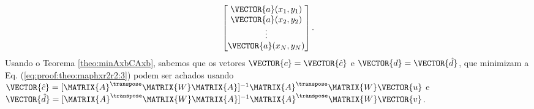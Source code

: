 \begin{myproofT}
\begin{equation}
\begin{bmatrix}
\VECTOR{a}(x_1,y_1)\\
\VECTOR{a}(x_2,y_2)\\
\vdots\\
\VECTOR{a}(x_N,y_N)
\end{bmatrix}.
\end{equation}
Usando o Teorema \ref{theo:minAxbCAxb}, sabemos que os vetores $\VECTOR{c}=\VECTOR{\hat{c}}$ e $\VECTOR{d}=\VECTOR{\hat{d}}$,
que minimizam a Eq. (\ref{eq:proof:theo:maphxr2r2:3}) podem ser achados usando 
$\VECTOR{\hat{c}}=[\MATRIX{A}^{\transpose}\MATRIX{W}\MATRIX{A}]^{-1}\MATRIX{A}^{\transpose}\MATRIX{W}\VECTOR{u}$ e
$\VECTOR{\hat{d}}=[\MATRIX{A}^{\transpose}\MATRIX{W}\MATRIX{A}]^{-1}\MATRIX{A}^{\transpose}\MATRIX{W}\VECTOR{v}$.
\begin{comment}
\begin{equation}\label{eq:proof:theo:maphxr2r2:5}
\VECTOR{\hat{c}}=[\MATRIX{A}^{\transpose}\MATRIX{W}\MATRIX{A}]^{-1}\MATRIX{A}^{\transpose}\MATRIX{W}\VECTOR{u},
\qquad
\VECTOR{\hat{d}}=[\MATRIX{A}^{\transpose}\MATRIX{W}\MATRIX{A}]^{-1}\MATRIX{A}^{\transpose}\MATRIX{W}\VECTOR{v}.
\end{equation}
\end{comment}
\end{myproofT}


